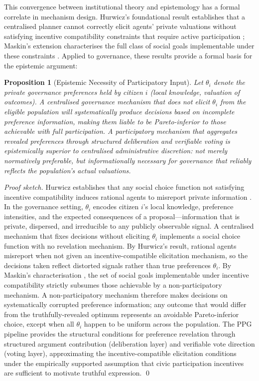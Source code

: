 \documentclass[12pt,a4paper,oneside]{report}
\newtheorem{proposition}{Proposition}[chapter]
\begin{document}
This convergence between institutional theory and epistemology has a formal correlate in mechanism design. Hurwicz's foundational result establishes that a centralised planner cannot correctly elicit agents' private valuations without satisfying incentive compatibility constraints that require active participation \citep{hurwicz1973design}; Maskin's extension characterises the full class of social goals implementable under these constraints \citep{maskin2008mechanism}. Applied to governance, these results provide a formal basis for the epistemic argument:

\begin{proposition}[Epistemic Necessity of Participatory Input]
\label{prop:epistemic}
Let $\theta_i$ denote the private governance preferences held by citizen $i$ (local knowledge, valuation of outcomes). A centralised governance mechanism that does not elicit $\theta_i$ from the eligible population will systematically produce decisions based on incomplete preference information, making them liable to be Pareto-inferior to those achievable with full participation. A participatory mechanism that aggregates revealed preferences through structured deliberation and verifiable voting is epistemically superior to centralised administrative discretion: not merely normatively preferable, but informationally necessary for governance that reliably reflects the population's actual valuations.
\end{proposition}

\begin{proof}[Proof sketch]
Hurwicz establishes that any social choice function not satisfying incentive compatibility induces rational agents to misreport private information \citep{hurwicz1973design}. In the governance setting, $\theta_i$ encodes citizen $i$'s local knowledge, preference intensities, and the expected consequences of a proposal---information that is private, dispersed, and irreducible to any publicly observable signal. A centralised mechanism that fixes decisions without eliciting $\theta_i$ implements a social choice function with no revelation mechanism. By Hurwicz's result, rational agents misreport when not given an incentive-compatible elicitation mechanism, so the decisions taken reflect distorted signals rather than true preferences $\theta_i$. By Maskin's characterisation \citep{maskin2008mechanism}, the set of social goals implementable under incentive compatibility strictly subsumes those achievable by a non-participatory mechanism. A non-participatory mechanism therefore makes decisions on systematically corrupted preference information; any outcome that would differ from the truthfully-revealed optimum represents an avoidable Pareto-inferior choice, except when all $\theta_i$ happen to be uniform across the population. The PPG pipeline provides the structural conditions for preference revelation through structured argument contribution (deliberation layer) and verifiable vote direction (voting layer), approximating the incentive-compatible elicitation conditions under the empirically supported assumption that civic participation incentives are sufficient to motivate truthful expression. \qed
\end{proof}
\end{document}
